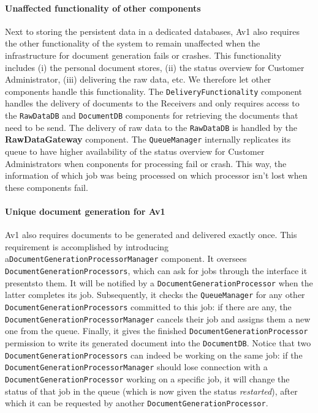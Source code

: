 \documentclass[a4paper,10pt]{article}
\begin{document}
\paragraph{Unaffected functionality of other components}
Next to storing the  persistent data in a dedicated databases, Av1 also requires the other functionality of the system to remain unaffected when the infrastructure for document generation fails or crashes. This functionality includes (i) the personal document stores, (ii) the status overview for Customer Administrator, (iii) delivering the raw data, etc.
We therefore let other components handle this functionality. The \texttt{DeliveryFunctionality} component handles the delivery of documents to the Receivers and only requires access to the \texttt{RawDataDB} and \texttt{DocumentDB} components for retrieving the documents that need to be send. The delivery of raw data to the \texttt{RawDataDB} is handled by the \textbf{RawDataGateway} component. The \texttt{QueueManager} internally replicates its queue to have higher availability of the status overview for Customer Administrators when conponents for processing fail or crash. This way, the information of which job was being processed on which processor isn't lost when these components fail.


\paragraph{Unique document generation for Av1}
Av1 also requires documents to be generated and delivered exactly once.
This requirement is accomplished by introducing a\texttt{DocumentGenerationProcessorManager} component. It oversees  \texttt{DocumentGenerationProcessors}, which can ask for jobs through the interface it presentsto them. It will be notified by a \texttt{DocumentGenerationProcessor} when the latter completes its job. Subsequently, it checks the \texttt{QueueManager} for any other \texttt{DocumentGenerationProcessors} committed to this job: if there are any, the \texttt{DocumentGenerationProcessorManager} cancels their job and assigns them a new one from the queue. Finally, it gives the finished \texttt{DocumentGenerationProcessor} permission to write its generated document into the \texttt{DocumentDB}. Notice that two \texttt{DocumentGenerationProcessors} can indeed be working on the same job: if the \texttt{DocumentGenerationProcessorManager} should lose connection with a \texttt{DocumentGenerationProcessor} working on a specific job, it will change the status of that job in the queue (which is now given the status \textit{restarted}), after which it can be requested by another \texttt{DocumentGenerationProcessor}.
\end{document}
